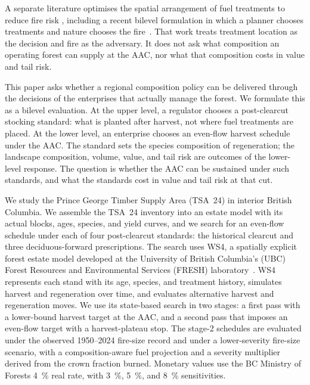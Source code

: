 A separate literature optimises the spatial arrangement of fuel treatments to reduce fire risk
\citep{chung_optimizing_2015,wei_optimize_2012}, including a recent bilevel formulation in which a
planner chooses treatments and nature chooses the fire~\citep{lagos_bilevel_2025}. That work treats
treatment location as the decision and fire as the adversary. It does not ask what composition an
operating forest can supply at the AAC, nor what that composition costs in value and tail risk.

This paper asks whether a regional composition policy can be delivered through the decisions of the
enterprises that actually manage the forest. We formulate this as a bilevel evaluation. At the upper
level, a regulator chooses a post-clearcut stocking standard: what is planted after harvest, not where
fuel treatments are placed. At the lower level, an enterprise chooses an even-flow harvest schedule
under the AAC. The standard sets the species composition of regeneration; the landscape composition,
volume, value, and tail risk are outcomes of the lower-level response. The question is whether the AAC
can be sustained under such standards, and what the standards cost in value and tail risk at that cut.

We study the Prince George Timber Supply Area (TSA~24) in interior British Columbia. We assemble the
TSA~24 inventory into an estate model with its actual blocks, ages, species, and yield curves, and we
search for an even-flow schedule under each of four post-clearcut standards: the historical clearcut
and three deciduous-forward prescriptions. The search uses WS4, a spatially explicit forest estate
model developed at the University of British Columbia's (UBC) Forest Resources and Environmental Services
(FRESH) laboratory~\citep{ubc_fresh_ws4_2026}. WS4 represents each stand with its age,
species, and treatment history, simulates harvest and regeneration over time, and evaluates
alternative harvest and regeneration moves. We use its state-based search in two stages: a first pass with a
lower-bound harvest target at the AAC, and a second pass that imposes an even-flow target with a
harvest-plateau stop. The stage-2 schedules are
evaluated under the observed 1950--2024 fire-size record and under a lower-severity fire-size
scenario, with a composition-aware fuel projection and a severity multiplier
derived from the crown fraction burned. Monetary values use the BC Ministry of Forests
\SI{4}{\percent} real rate, with
\SI{3}{\percent}, \SI{5}{\percent}, and \SI{8}{\percent} sensitivities.

